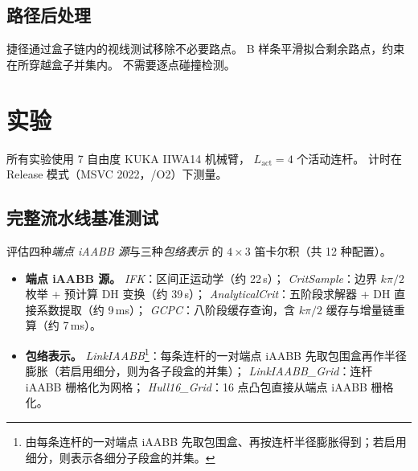 \documentclass[journal]{IEEEtran}
\newcommand{\LinkIAABBDef}{由每条连杆的一对端点 iAABB 先取包围盒、再按连杆半径膨胀得到；若启用细分，则表示各细分子段盒的并集。}
\begin{document}
\subsection{路径后处理}\label{sec:post_process}

捷径通过盒子链内的视线测试移除不必要路点。
B 样条平滑拟合剩余路点，约束在所穿越盒子并集内。
不需要逐点碰撞检测。

\section{实验}\label{sec:experiments}

所有实验使用 7 自由度 KUKA IIWA14 机械臂，
$L_\text{act}{=}4$ 个活动连杆。
计时在 Release 模式（MSVC 2022，/O2）下测量。

\subsection{完整流水线基准测试}\label{sec:exp_pipeline}

评估四种\emph{端点 iAABB 源}与三种\emph{包络表示}
的 $4{\times}3$ 笛卡尔积（共 12 种配置）。

\begin{itemize}
  \item \textbf{端点 iAABB 源。}
    \emph{IFK}：区间正运动学（约 22\,\textmu s）；
    \emph{CritSample}：边界 $k\pi/2$ 枚举 + 预计算 DH 变换（约 39\,\textmu s）；
    \emph{AnalyticalCrit}：五阶段求解器 + DH 直接系数提取（约 9\,ms）；
    \emph{GCPC}：八阶段缓存查询，含 $k\pi/2$ 缓存与增量链重算（约 7\,ms）。
  \item \textbf{包络表示。}
    \emph{LinkIAABB}\footnote{\LinkIAABBDef}：每条连杆的一对端点 iAABB 先取包围盒再作半径膨胀（若启用细分，则为各子段盒的并集）；
    \emph{LinkIAABB\_Grid}：连杆 iAABB 栅格化为网格；
    \emph{Hull16\_Grid}：16 点凸包直接从端点 iAABB 栅格化。
\end{itemize}
\end{document}
